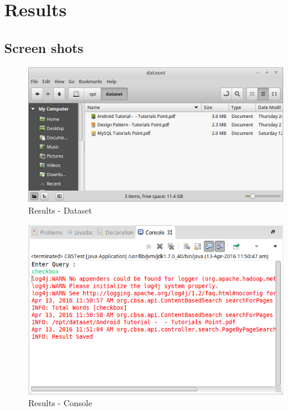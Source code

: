 \documentclass[oneside,a4paper,12pt]{report}
\begin{document}
{%
\chapter{Results}

\section{Screen shots}

\begin{figure}[H]
\includegraphics{results-dataset}
\caption{Results - Dataset}
\end{figure}

\begin{figure}[H]
\includegraphics{results-console}
\caption{Results - Console}
\end{figure}

}
\end{document}
